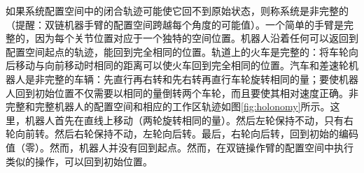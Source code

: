 
如果系统配置空间中的闭合轨迹可能使它回不到原始状态，则称系统是非完整的（提醒：双链机器手臂的配置空间跨越每个角度的可能值）。一个简单的手臂是完整的，因为每个关节位置对应于一个独特的空间位置。机器人沿着任何可以返回到配置空间起点的轨迹，能回到完全相同的位置。轨道上的火车是完整的：将车轮向后移动与向前移动时相同的距离可以使火车回到完全相同的位置。汽车和差速轮机器人是非完整的车辆：先直行再右转和先右转再直行车轮旋转相同的量；要使机器人回到初始位置不仅需要以相同的量倒转两个车轮，而且要使其相对速度正确。非完整和完整机器人的配置空间和相应的工作区轨迹如图\ref{fig:holonomy}所示。这里，机器人首先在直线上移动（两轮旋转相同的量）。然后左轮保持不动，只有右轮向前转。然后右轮保持不动，左轮向后转。最后，右轮向后转，回到初始的编码值（零）。然而，机器人并没有回到起点。然而，在双链操作臂的配置空间中执行类似的操作，可以回到初始位置。

